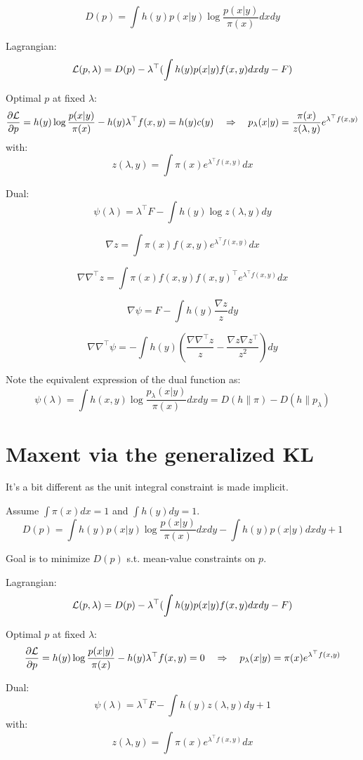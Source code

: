 \documentclass[english]{scrartcl}
\begin{document}
$$
D(p) = \int h(y)p(x|y) \log \frac{p(x|y)}{\pi(x)} dxdy
$$

Lagrangian:
$$
{\cal L}(p,\lambda) = D(p) -\lambda^\top (\int h(y)p(x|y)f(x,y)dxdy - F)
$$

Optimal $p$ at fixed $\lambda$:
$$
\frac{\partial{\cal L}}{\partial p}
=
h(y) \log \frac{p(x|y)}{\pi(x)} - h(y) \lambda^\top f(x,y)
= h(y) c(y)
\quad
\Rightarrow
\quad
p_{\lambda}(x|y) = \frac{\pi(x)}{z(\lambda,y)} e^{\lambda^\top f(x,y)}
$$
with:
$$
z(\lambda,y) = \int \pi(x) e^{\lambda^\top f(x,y)} dx
$$

Dual:
$$
\psi(\lambda) = \lambda^\top F - \int h(y) \log z(\lambda, y) dy 
$$

$$
\nabla z
=
\int \pi(x) f(x,y)  e^{\lambda^\top f(x,y)} dx
$$

$$
\nabla \nabla^\top z 
=
\int \pi(x) f(x,y) f(x,y)^\top e^{\lambda^\top f(x,y)} dx
$$

$$
\nabla\psi
= F - \int h(y) \frac{\nabla z}{z} dy
$$

$$
\nabla\nabla^\top\psi
= - \int h(y) \left(
\frac{\nabla \nabla^\top z}{z} 
-
\frac{\nabla z \nabla z^\top}{z^2}
\right)
dy
$$

Note the equivalent expression of the dual function as:
$$
\psi(\lambda)
=
\int h(x,y) \log \frac{p_\lambda(x|y)}{\pi(x)} dx dy
= D(h\|\pi) - D(h\|p_\lambda)
$$


\section{Maxent via the generalized KL}

It's a bit different as the unit integral constraint is made implicit.

Assume $\int\pi(x)dx=1$ and $\int h(y) dy = 1$. 
$$
D(p) 
= \int h(y)p(x|y) \log \frac{p(x|y)}{\pi(x)} dxdy
- \int h(y)p(x|y)dx dy
+ 1
$$

Goal is to minimize $D(p)$ s.t. mean-value constraints on $p$. 

Lagrangian:
$$
{\cal L}(p,\lambda) = D(p) -\lambda^\top (\int h(y)p(x|y)f(x,y)dxdy - F)
$$

Optimal $p$ at fixed $\lambda$:
$$
\frac{\partial{\cal L}}{\partial p}
=
h(y) \log \frac{p(x|y)}{\pi(x)} - h(y) \lambda^\top f(x,y)
= 0
\quad
\Rightarrow
\quad
p_{\lambda}(x|y) = \pi(x) e^{\lambda^\top f(x,y)}
$$

Dual:
$$
\psi(\lambda) = \lambda^\top F - \int h(y)z(\lambda, y) dy + 1
$$
with:
$$
z(\lambda,y) = \int \pi(x) e^{\lambda^\top f(x,y)} dx
$$
\end{document}
